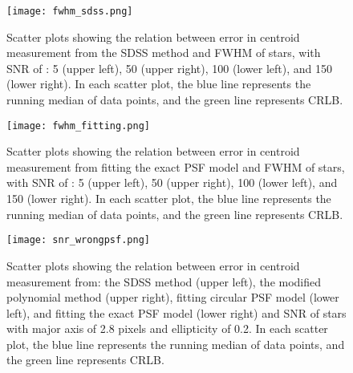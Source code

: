 \documentclass[12pt, preprint]{aastex}
\begin{document}
\begin{figure}[!htb]
  \texttt{[image: fwhm\_sdss.png]}
\endminipage
\caption{Scatter plots showing the relation between error in centroid measurement from the SDSS method and FWHM of stars, with SNR  of : 5 (upper left), 50 (upper right), 100 (lower left), and 150 (lower right). In each scatter plot, the blue line represents the running median of data points, and the green line represents CRLB.}\label{7}
\end{figure}

\begin{figure}[!htb]
  \texttt{[image: fwhm\_fitting.png]}
\endminipage
\caption{Scatter plots showing the relation between error in centroid measurement from fitting the exact PSF model and FWHM of stars, with SNR  of : 5 (upper left), 50 (upper right), 100 (lower left), and 150 (lower right). In each scatter plot, the blue line represents the running median of data points, and the green line represents CRLB.}\label{8}
\end{figure}

\begin{figure}[!htb]
  \texttt{[image: snr\_wrongpsf.png]}
\endminipage
\caption{Scatter plots showing the relation between error in centroid measurement from: the SDSS method (upper left), the modified polynomial method (upper right), fitting circular PSF model (lower left), and  fitting the exact PSF model (lower right) and SNR of stars with major axis of 2.8 pixels and ellipticity of 0.2. In each scatter plot, the blue line represents the running median of data points, and the green line represents CRLB.}\label{9}
\end{figure}
\end{document}

